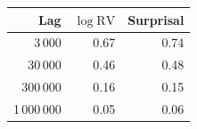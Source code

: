 \begin{tabular}{rrr}
\toprule
Lag & $\log\mathrm{RV}$ & Surprisal \\
\midrule
3\,000 & 0.67 & 0.74 \\
30\,000 & 0.46 & 0.48 \\
300\,000 & 0.16 & 0.15 \\
1\,000\,000 & 0.05 & 0.06 \\
\bottomrule
\end{tabular}

